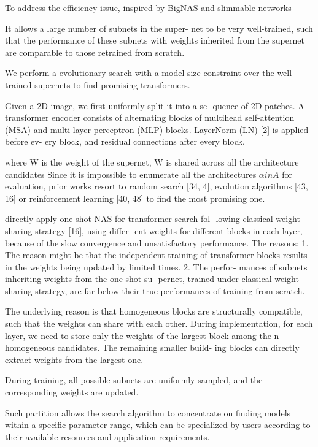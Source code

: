 \documentclass[UTF8]{article}
\begin{document}
To address the efficiency issue, inspired by BigNAS \cite{yu2020bignas} and slimmable networks \cite{yu2020bignas, yu2018slimmable}

It allows a large number of subnets in the super- net to be very well-trained, such that the performance of these subnets with weights inherited from the supernet are comparable to those retrained from scratch.

We perform a evolutionary search with a model size constraint over the well-trained supernets to find promising transformers.

Given a 2D image, we first uniformly split it into a se- quence of 2D patches. A transformer encoder consists of alternating blocks of multihead self-attention (MSA) and multi-layer perceptron (MLP) blocks. LayerNorm (LN) [2] is applied before ev- ery block, and residual connections after every block.

where W is the weight of the supernet, W is shared across all the architecture candidates
Since it is impossible to enumerate all the architectures $\alpha in A$ for evaluation, prior works resort to random search [34, 4], evolution algorithms [43, 16] or reinforcement learning [40, 48] to find the most promising one.


directly apply one-shot NAS for transformer search fol- lowing classical weight sharing strategy [16], using differ- ent weights for different blocks in each layer, because of the slow convergence and unsatisfactory performance. The reasons: 1. The reason might be that the independent training of transformer blocks results in the weights being updated by limited times. 2. The perfor- mances of subnets inheriting weights from the one-shot su- pernet, trained under classical weight sharing strategy, are far below their true performances of training from scratch. 

The underlying reason is that homogeneous blocks are structurally compatible, such that the weights can share with each other. During implementation, for each layer, we need to store only the weights of the largest block among the n homogeneous candidates. The remaining smaller build- ing blocks can directly extract weights from the largest one.

During training, all possible subnets are uniformly sampled, and the corresponding weights are updated.

Such partition allows the search algorithm to concentrate on finding models within a specific parameter range, which can be specialized by users according to their available resources and application requirements.
\end{document}
